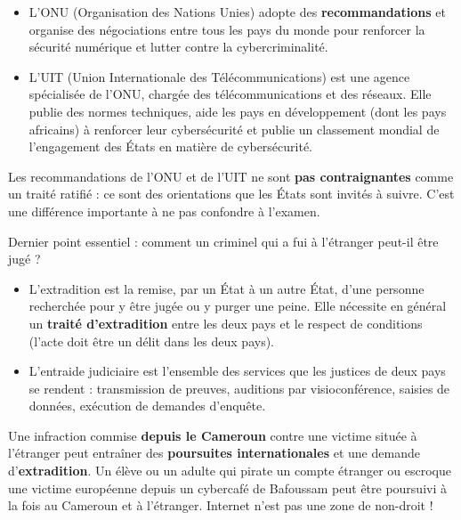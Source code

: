 \documentclass[11pt]{article}
\newcommand{\cle}[1]{{\popxbold\color{popdark}#1}}
\newcounter{popsec}
\newcounter{popsub}
\newcommand{\courssub}[1]{%
  \stepcounter{popsub}%
  \par\vspace{9pt}\noindent{\popxbold\fontsize{11.5}{13}\selectfont\color{popink}{\color{poporange}\thepopsec.\thepopsub}\hspace{6pt}#1}\par\nopagebreak\vspace{4pt}
}
\begin{document}
\begin{definition}
\begin{itemize}
\item L'\cle{ONU} (Organisation des Nations Unies) adopte des \textbf{recommandations} et organise des négociations entre tous les pays du monde pour renforcer la sécurité numérique et lutter contre la cybercriminalité.
\item L'\cle{UIT} (Union Internationale des Télécommunications) est une agence spécialisée de l'ONU, chargée des télécommunications et des réseaux. Elle publie des normes techniques, aide les pays en développement (dont les pays africains) à renforcer leur cybersécurité et publie un classement mondial de l'engagement des États en matière de cybersécurité.
\end{itemize}
\end{definition}

\begin{attention}
Les recommandations de l'ONU et de l'UIT ne sont \textbf{pas contraignantes} comme un traité ratifié : ce sont des orientations que les États sont invités à suivre. C'est une différence importante à ne pas confondre à l'examen.
\end{attention}

\courssub{Extradition et entraide judiciaire}

Dernier point essentiel : comment un criminel qui a fui à l'étranger peut-il être jugé ?

\begin{definition}
\begin{itemize}
\item L'\cle{extradition} est la remise, par un État à un autre État, d'une personne recherchée pour y être jugée ou y purger une peine. Elle nécessite en général un \textbf{traité d'extradition} entre les deux pays et le respect de conditions (l'acte doit être un délit dans les deux pays).
\item L'\cle{entraide judiciaire} est l'ensemble des services que les justices de deux pays se rendent : transmission de preuves, auditions par visioconférence, saisies de données, exécution de demandes d'enquête.
\end{itemize}
\end{definition}

\begin{attention}
Une infraction commise \textbf{depuis le Cameroun} contre une victime située à l'étranger peut entraîner des \textbf{poursuites internationales} et une demande d'\textbf{extradition}. Un élève ou un adulte qui pirate un compte étranger ou escroque une victime européenne depuis un cybercafé de Bafoussam peut être poursuivi à la fois au Cameroun et à l'étranger. Internet n'est pas une zone de non-droit !
\end{attention}
\end{document}

